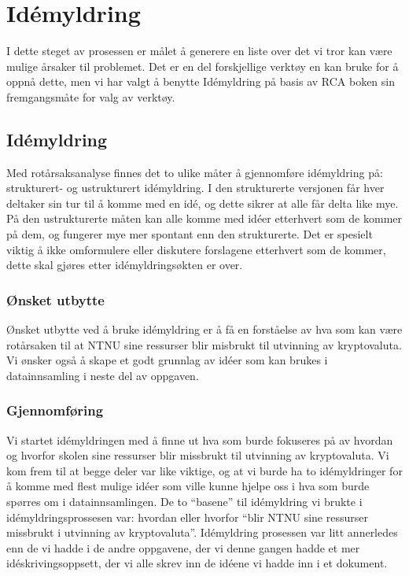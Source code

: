 \chapter{Idémyldring}
I dette steget av prosessen er målet å generere en liste over det vi tror kan være mulige årsaker til problemet. Det er en del forskjellige verktøy en kan bruke for å oppnå dette, men vi har valgt å benytte Idémyldring på basis av RCA boken \cite{RCA} sin fremgangsmåte for valg av verktøy.

\section{Idémyldring}
Med rotårsaksanalyse finnes det to ulike måter å gjennomføre idémyldring på: strukturert- og ustrukturert idémyldring. I den strukturerte versjonen får hver deltaker sin tur til å komme med en idé, og dette sikrer at alle får delta like mye. På den ustrukturerte måten kan alle komme med idéer etterhvert som de kommer på dem, og fungerer mye mer spontant enn den strukturerte. Det er spesielt viktig å ikke omformulere eller diskutere forslagene etterhvert som de kommer, dette skal gjøres etter idémyldringsøkten er over.

\subsection{Ønsket utbytte}
Ønsket utbytte ved å bruke idémyldring er å få en forståelse av hva som kan være rotårsaken til at NTNU sine ressurser blir misbrukt til utvinning av kryptovaluta. Vi ønsker også å skape et godt grunnlag av idéer som kan brukes i datainnsamling i neste del av oppgaven.

\subsection{Gjennomføring}
Vi startet idémyldringen med å finne ut hva som burde fokuseres på av hvordan og hvorfor skolen sine ressurser blir missbrukt til utvinning av kryptovaluta. Vi kom frem til at begge deler var like viktige, og at vi burde ha to idémyldringer for å komme med flest mulige idéer som ville kunne hjelpe oss i hva som burde spørres om i datainnsamlingen. De to ``basene'' til idémyldring vi brukte i idémyldringsprossesen var: hvordan eller hvorfor ``blir NTNU sine ressurser missbrukt i utvinning av kryptovaluta''. Idémyldring prosessen var litt annerledes enn de vi hadde i de andre oppgavene, der vi denne gangen hadde et mer idéskrivingsoppsett, der vi alle skrev inn de idéene vi hadde inn i et dokument.

